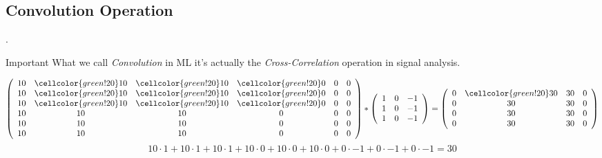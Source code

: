 \documentclass[xcolor={x11names, table}, compress]{beamer}
\newcommand{\insertsubsec}{\thesection.\thesubsection~\insertsubsection}
\begin{document}
\subsection{Convolution Operation}
\begin{frame}{\insertsubsec}
    \begin{alertblock}{Important}
        What we call \textit{Convolution} in ML it's actually the \textit{Cross-Correlation} operation
        in signal analysis.
    \end{alertblock}
    
    \begin{align*}
        \left(
        \begin{array}{cccccc}
            10 & \cellcolor{green!20}10 & \cellcolor{green!20}10 & \cellcolor{green!20}0 & 0 & 0 \\
            10 & \cellcolor{green!20}10 & \cellcolor{green!20}10 & \cellcolor{green!20}0 & 0 & 0 \\
            10 & \cellcolor{green!20}10 & \cellcolor{green!20}10 & \cellcolor{green!20}0 & 0 & 0 \\
            10 & 10 & 10 & 0 & 0 & 0 \\
            10 & 10 & 10 & 0 & 0 & 0 \\
            10 & 10 & 10 & 0 & 0 & 0 \\
        \end{array}
        \right)
        *
        \left(
        \begin{array}{ccc}
            1 & 0 & -1 \\
            1 & 0 & -1 \\ 
            1 & 0 & -1 \\
        \end{array}
        \right)
        = 
        \left(
        \begin{array}{cccc}
            0 & \cellcolor{green!20}30 & 30 & 0 \\
            0 & 30 & 30 & 0 \\
            0 & 30 & 30 & 0 \\
            0 & 30 & 30 & 0 \\
        \end{array}
        \right)
    \end{align*}
    $$
        10 \cdot 1 + 10 \cdot 1 + 10 \cdot 1 +
        10 \cdot 0 + 10 \cdot 0 + 10 \cdot 0 +
        0 \cdot -1 + 0 \cdot -1 + 0 \cdot -1 = 30
    $$

\end{frame}
\end{document}
